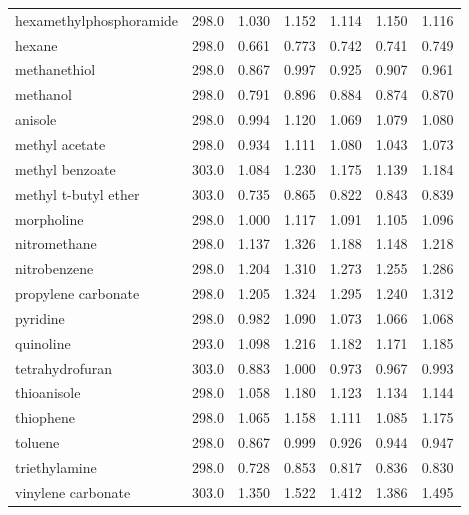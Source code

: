 \documentclass[aps,%
superscriptaddress,
 amsmath,amssymb,
floatfix,
twocolumn
]{revtex4-2}
\begin{document}
\begin{table}[b]
{\begin{tabular}{@{}laBaBaB@{}}
hexamethylphosphoramide & 298.0 & 1.030 & 1.152  & 1.114 & 1.150 & 1.116 \\
hexane & 298.0 & 0.661 & 0.773  & 0.742 & 0.741 & 0.749 \\
methanethiol & 298.0 & 0.867 & 0.997  & 0.925 & 0.907 & 0.961 \\
methanol & 298.0 & 0.791 & 0.896  & 0.884 & 0.874 & 0.870 \\
anisole & 298.0 & 0.994 & 1.120  & 1.069 & 1.079 & 1.080 \\
methyl acetate & 298.0 & 0.934 & 1.111  & 1.080 & 1.043 & 1.073 \\
methyl benzoate & 303.0 & 1.084 & 1.230  & 1.175 & 1.139 & 1.184 \\
methyl t-butyl ether & 303.0 & 0.735 & 0.865  & 0.822 & 0.843 & 0.839 \\
morpholine & 298.0 & 1.000 & 1.117  & 1.091 & 1.105 & 1.096 \\
nitromethane & 298.0 & 1.137 & 1.326  & 1.188 & 1.148 & 1.218 \\
nitrobenzene & 298.0 & 1.204 & 1.310  & 1.273 & 1.255 & 1.286 \\
propylene carbonate & 298.0 & 1.205 & 1.324  & 1.295 & 1.240 & 1.312 \\
pyridine & 298.0 & 0.982 & 1.090  & 1.073 & 1.066 & 1.068 \\
quinoline & 293.0 & 1.098 & 1.216  & 1.182 & 1.171 & 1.185 \\
tetrahydrofuran & 303.0 & 0.883 & 1.000  & 0.973 & 0.967 & 0.993 \\
thioanisole & 298.0 & 1.058 & 1.180  & 1.123 & 1.134 & 1.144 \\
thiophene & 298.0 & 1.065 & 1.158  & 1.111 & 1.085 & 1.175 \\
toluene & 298.0 & 0.867 & 0.999  & 0.926 & 0.944 & 0.947 \\
triethylamine & 298.0 & 0.728 & 0.853  & 0.817 & 0.836 & 0.830 \\
vinylene carbonate & 303.0 & 1.350 & 1.522  & 1.412 & 1.386 & 1.495 \\

\bottomrule
\end{tabular}%
}
\hspace{5pt}
\end{table}
\end{document}

